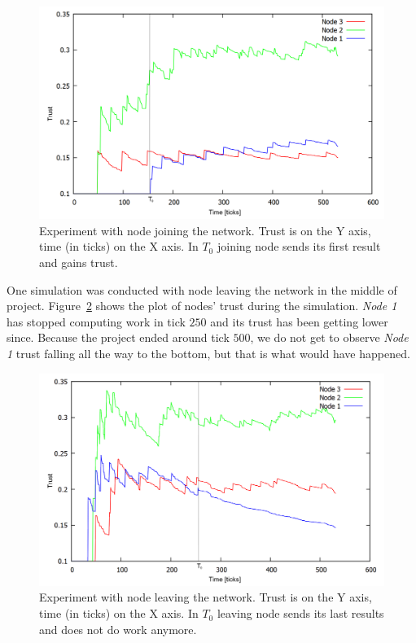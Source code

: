 \begin{figure}
\centering
\includegraphics[width=\textwidth]{diagrams/trust_join.png}
\caption{Experiment with node joining the network. Trust is on the Y axis, time (in ticks) on the X axis. In $T_0$ joining node sends its first result and gains trust.}
\label{f:trust_join}
\end{figure}

One simulation was conducted with node leaving the network in the middle of project. Figure~\ref{f:trust_leave} shows the plot of nodes' trust during the simulation. \emph{Node 1} has stopped computing work in tick $250$ and its trust has been getting lower since. Because the project ended around tick $500$, we do not get to observe \emph{Node 1} trust falling all the way to the bottom, but that is what would have happened.

\begin{figure}
\centering
\includegraphics[width=\textwidth]{diagrams/trust_leave.png}
\caption{Experiment with node leaving the network. Trust is on the Y axis, time (in ticks) on the X axis. In $T_0$ leaving node sends its last results and does not do work anymore.}
\label{f:trust_leave}
\end{figure}


